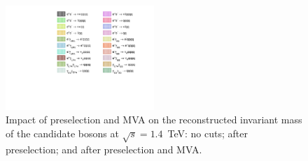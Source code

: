 \begin{figure}
\includegraphics[width=0.5\textwidth]{PhysicsAnalysis/Plots/PreSelection/1400GeV/Legend.pdf}
\caption[Impact of preselection and MVA on the reconstructed invariant mass of the candidate bosons at $\sqrt{s}=1.4$~TeV:   \protect{} no cuts; \protect{} after preselection; and \protect{} after preselection and MVA.]{Impact of preselection and MVA on the reconstructed invariant mass of the candidate bosons at $\sqrt{s}=1.4$~TeV:   \protect{} no cuts; \protect{} after preselection; and \protect{} after preselection and MVA.}
\label{fig:synbosonmass1400GeVMVAimpact}
\end{figure}

